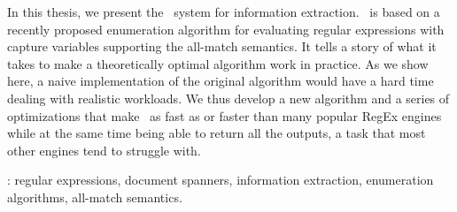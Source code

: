 In this thesis, we present the \rematch\ system for information extraction.
\rematch\ is based on a recently proposed enumeration algorithm for evaluating
regular expressions with capture variables supporting the all-match semantics.
It tells a story of what it takes to make a theoretically optimal algorithm work
in practice. As we show here, a naive implementation of the original algorithm
would have a hard time dealing with realistic workloads. We thus develop a new
algorithm and a series of optimizations that make \rematch\ as fast as or faster
than many popular RegEx engines while at the same time being able to return all
the outputs, a task that most other engines tend to struggle with. \

\vfill
{}:  regular expressions, document spanners, information
extraction, enumeration algorithms, all-match semantics.
